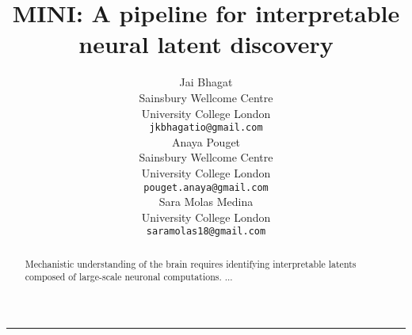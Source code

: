 \documentclass{article}
\title{MINI: A pipeline for interpretable neural latent discovery}
\author{
  Jai Bhagat \\
  Sainsbury Wellcome Centre \\
  University College London \\
  \texttt{jkbhagatio@gmail.com} \\
  \And
  Anaya Pouget \\
  Sainsbury Wellcome Centre \\
  University College London \\
  \texttt{pouget.anaya@gmail.com} \\
  \And
  Sara Molas Medina \\
  University College London \\
  \texttt{saramolas18@gmail.com} \\
}
\begin{document}
\maketitle

\begin{abstract}
Mechanistic understanding of the brain requires identifying interpretable latents composed of large-scale neuronal computations. ...
\end{abstract}






\vspace{2em} \hrule  
\newpage

\nocite{lenail_2019_nnsvg}






\end{document}
